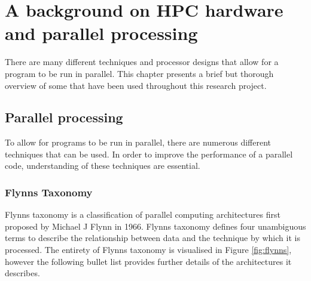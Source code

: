 \documentclass[a4paper,11pt]{report}
\begin{document}
\chapter{A background on HPC hardware and parallel processing}
There are many different techniques and processor designs that allow for a program to be run in parallel. This chapter presents a brief but thorough overview of some that have been used throughout this research project. 

\section{Parallel processing}
To allow for programs to be run in parallel, there are numerous different techniques that can be used. In order to improve the performance of a parallel code, understanding of these techniques are essential.

\subsection{Flynns Taxonomy}
Flynns taxonomy is a classification of parallel computing architectures first proposed by Michael J Flynn in 1966. Flynns taxonomy defines four unambiguous terms to describe the relationship between data and the technique by which it is processed. The entirety of Flynns taxonomy is visualised in Figure \ref{fig:flynns}, however the following bullet list provides further details of the architectures it describes.
\end{document}
